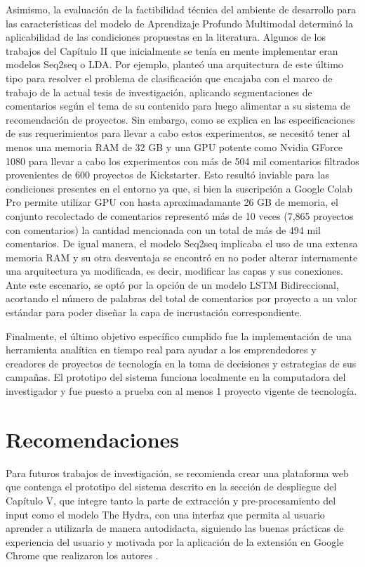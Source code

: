 Asimismo, la evaluación de la factibilidad técnica del ambiente de desarrollo para las características del modelo de Aprendizaje Profundo Multimodal determinó la aplicabilidad de las condiciones propuestas en la literatura. Algunos de los trabajos del Capítulo II que inicialmente se tenía en mente implementar eran modelos Seq2seq o LDA. Por ejemplo, \cite{pr_shafqat2019topicpredictions} planteó una arquitectura de este último tipo para resolver el problema de clasificación que encajaba con el marco de trabajo de la actual tesis de investigación, aplicando segmentaciones de comentarios según el tema de su contenido para luego alimentar a su sistema de recomendación de proyectos. Sin embargo, como se explica en las especificaciones de sus requerimientos para llevar a cabo estos experimentos, se necesitó tener al menos una memoria RAM de 32 GB y una GPU potente como Nvidia GForce 1080 para llevar a cabo los experimentos con más de 504 mil comentarios filtrados provenientes de 600 proyectos de Kickstarter. Esto resultó inviable para las condiciones presentes en el entorno ya que, si bien la suscripción a Google Colab Pro permite utilizar GPU con hasta aproximadamante 26 GB de memoria, el conjunto recolectado de comentarios representó más de 10 veces (7,865 proyectos con comentarios) la cantidad mencionada con un total de más de 494 mil comentarios. De igual manera, el modelo Seq2seq implicaba el uso de una extensa memoria RAM y su otra desventaja se encontró en no poder alterar internamente una arquitectura ya modificada, es decir, modificar las capas y sus conexiones. Ante este escenario, se optó por la opción de un modelo LSTM Bidireccional, acortando el número de palabras del total de comentarios por proyecto a un valor estándar para poder diseñar la capa de incrustación correspondiente.

Finalmente, el último objetivo específico cumplido fue la implementación de una herramienta analítica en tiempo real para ayudar a los emprendedores y creadores de proyectos de tecnología en la toma de decisiones y estrategias de sus campañas. El prototipo del sistema funciona localmente en la computadora del investigador y fue puesto a prueba con al menos 1 proyecto vigente de tecnología.

\section{Recomendaciones}
Para futuros trabajos de investigación, se recomienda crear una plataforma web que contenga el prototipo del sistema descrito en la sección de despliegue del Capítulo V, que integre tanto la parte de extracción y pre-procesamiento del input como el modelo The Hydra, con una interfaz que permita al usuario aprender a utilizarla de manera autodidacta, siguiendo las buenas prácticas de experiencia del usuario y motivada por la aplicación de la extensión en Google Chrome que realizaron los autores \cite{pr_chen2013kickpredict}.


